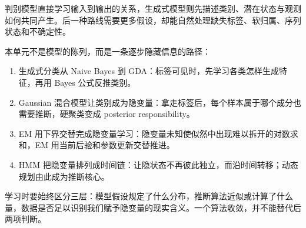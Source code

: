 判别模型直接学习输入到输出的关系，生成式模型则先描述类别、潜在状态与观测如何共同产生。后一种路线需要更多假设，却能自然处理缺失标签、软归属、序列状态和不确定性。

本单元不是模型的陈列，而是一条逐步隐藏信息的路径：

\begin{enumerate}
\def\labelenumi{\arabic{enumi}.}
\tightlist
\item
  生成式分类从 Naive Bayes 到 GDA：标签可见时，先学习各类怎样生成特征，再用 Bayes 公式反推类别。
\item
  Gaussian 混合模型让类别成为隐变量：拿走标签后，每个样本属于哪个成分也需要推断，硬聚类变成 posterior responsibility。
\item
  EM 用下界交替完成隐变量学习：隐变量未知使似然中出现难以拆开的对数求和，EM 用当前后验和参数更新交替推进。
\item
  HMM 把隐变量排列成时间链：让隐状态不再彼此独立，而沿时间转移；动态规划由此成为推断核心。
\end{enumerate}

学习时要始终区分三层：模型假设规定了什么分布，推断算法近似或计算了什么量，数据是否足以识别我们赋予隐变量的现实含义。一个算法收敛，并不能替代后两项判断。
